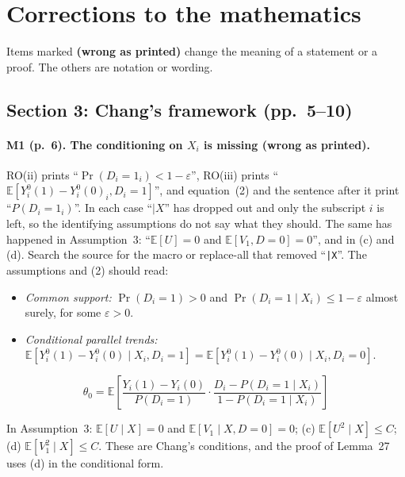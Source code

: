 \documentclass[11pt]{article}
\providecommand{\E}{\mathbb{E}}
\newenvironment{ins}{\begin{leftbar}}{\end{leftbar}}
\theoremstyle{plain}
\theoremstyle{remark}
\begin{document}
\section{Corrections to the mathematics}\label{sec:math}

Items marked \textbf{(wrong as printed)} change the meaning of a statement or a
proof. The others are notation or wording.

\subsection{Section 3: Chang's framework (pp.~5--10)}

\paragraph{M1 (p.~6). The conditioning on $X_i$ is missing (wrong as printed).}
RO(ii) prints ``$\Pr(D_i=1_i)<1-\varepsilon$'', RO(iii) prints
``$\E[Y_i^0(1)-Y_i^0(0)_i,D_i=1]$'', and equation~(2) and the sentence after it
print ``$P(D_i=1_i)$''. In each case ``$\mid X$'' has dropped out and only the
subscript $i$ is left, so the identifying assumptions do not say what they
should. The same has happened in Assumption~3: ``$\E[U]=0$ and
$\E[V_1,D=0]=0$'', and in (c) and (d). Search the source for the macro or
replace-all that removed ``\verb+|X+''. The assumptions and (2) should read:
\begin{ins}
\begin{itemize}
\item[RO(ii)] \emph{Common support:} $\Pr(D_i=1)>0$ and
  $\Pr(D_i=1\mid X_i)\le1-\varepsilon$ almost surely, for some $\varepsilon>0$.
\item[RO(iii)] \emph{Conditional parallel trends:}
  $\E[Y_i^0(1)-Y_i^0(0)\mid X_i,D_i=1]=\E[Y_i^0(1)-Y_i^0(0)\mid X_i,D_i=0]$.
\end{itemize}
\[
  \theta_0=\E\left[\frac{Y_i(1)-Y_i(0)}{P(D_i=1)}\cdot
  \frac{D_i-P(D_i=1\mid X_i)}{1-P(D_i=1\mid X_i)}\right]
\]
\end{ins}
In Assumption~3: $\E[U\mid X]=0$ and $\E[V_1\mid X,D=0]=0$; (c)
$\E[U^2\mid X]\le C$; (d) $\E[V_1^2\mid X]\le C$. These are Chang's conditions,
and the proof of Lemma~27 uses (d) in the conditional form.
\end{document}
